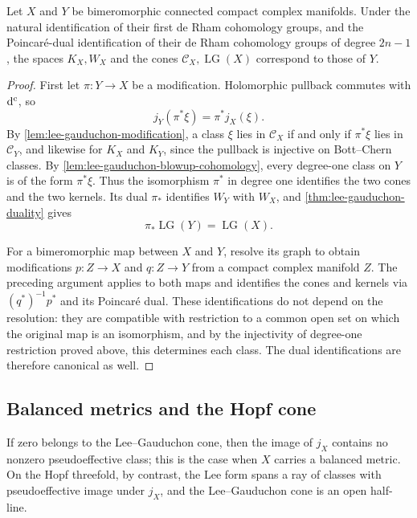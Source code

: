 \begin{theorem}\label{thm:lee-gauduchon-bimeromorphic}
Let $X$ and $Y$ be bimeromorphic connected compact complex manifolds. Under the natural identification of their first de Rham cohomology groups, and the Poincar\'e-dual identification of their de Rham cohomology groups of degree $2n-1$, the spaces $K_X,W_X$ and the cones $\mathcal C_X,\operatorname{LG}(X)$ correspond to those of $Y$.
\end{theorem}
\begin{proof}
First let $\pi\colon Y\to X$ be a modification. Holomorphic pullback commutes with $\mathrm d^{\mathrm c}$, so
\[
 j_Y(\pi^*\xi)=\pi^*j_X(\xi).
\]
By \cref{lem:lee-gauduchon-modification}, a class $\xi$ lies in $\mathcal C_X$ if and only if $\pi^*\xi$ lies in $\mathcal C_Y$, and likewise for $K_X$ and $K_Y$, since the pullback is injective on Bott--Chern classes. By \cref{lem:lee-gauduchon-blowup-cohomology}, every degree-one class on $Y$ is of the form $\pi^*\xi$. Thus the isomorphism $\pi^*$ in degree one identifies the two cones and the two kernels. Its dual $\pi_*$ identifies $W_Y$ with $W_X$, and \cref{thm:lee-gauduchon-duality} gives
\[
 \pi_*\operatorname{LG}(Y)=\operatorname{LG}(X).
\]

For a bimeromorphic map between $X$ and $Y$, resolve its graph to obtain modifications $p\colon Z\to X$ and $q\colon Z\to Y$ from a compact complex manifold $Z$. The preceding argument applies to both maps and identifies the cones and kernels via $(q^*)^{-1}p^*$ and its Poincar\'e dual. These identifications do not depend on the resolution: they are compatible with restriction to a common open set on which the original map is an isomorphism, and by the injectivity of degree-one restriction proved above, this determines each class. The dual identifications are therefore canonical as well.
\end{proof}

\subsection{Balanced metrics and the Hopf cone}

If zero belongs to the Lee--Gauduchon cone, then the image of $j_X$ contains no nonzero pseudoeffective class; this is the case when $X$ carries a balanced metric. On the Hopf threefold, by contrast, the Lee form spans a ray of classes with pseudoeffective image under $j_X$, and the Lee--Gauduchon cone is an open half-line.

